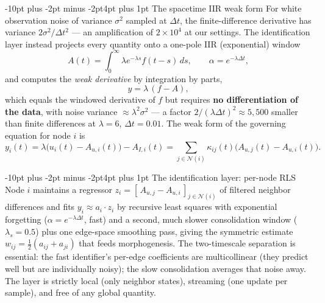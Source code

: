 \documentclass[10pt]{article}
\makeatletter
\renewcommand\subsection{\@startsection{subsection}{2}{\z@}%
  {-10pt plus -2pt minus -2pt}{4pt plus 1pt}%
  {\normalfont\bfseries\normalsize}}
\makeatother
\begin{document}
\subsection{The spacetime IIR weak form}
For white observation noise of variance $\sigma^2$ sampled at $\Delta t$, the
finite-difference derivative has variance $2\sigma^2/\Delta t^2$ --- an amplification of
$2 \times 10^4$ at our settings. The identification layer instead projects every
quantity onto a one-pole IIR (exponential) window
\begin{equation}
A(t) = \int_0^\infty \lambda e^{-\lambda s} f(t-s)\,ds, \qquad
\alpha = e^{-\lambda \Delta t},
\end{equation}
and computes the \emph{weak derivative} by integration by parts,
\begin{equation}
y = \lambda\,(f - A),
\end{equation}
which equals the windowed derivative of $f$ but requires \textbf{no differentiation of
the data}, with noise variance $\approx \lambda^2 \sigma^2$ --- a factor
$2/(\lambda \Delta t)^2 \approx 5{,}500$ smaller than finite differences at
$\lambda = 6$, $\Delta t = 0.01$. The weak form of the governing equation for node $i$
is
\begin{equation}
y_i(t) = \lambda\bigl(u_i(t) - A_{u,i}(t)\bigr) - A_{I,i}(t)
= \sum_{j \in \mathcal{N}(i)} \kappa_{ij}(t)\bigl(A_{u,j}(t) - A_{u,i}(t)\bigr).
\end{equation}

\subsection{The identification layer: per-node RLS}
Node $i$ maintains a regressor $z_i = [\,A_{u,j} - A_{u,i}\,]_{j \in \mathcal{N}(i)}$
of filtered neighbor differences and fits $y_i \approx a_i \cdot z_i$ by recursive
least squares with exponential forgetting ($\alpha = e^{-\lambda \Delta t}$, fast) and
a second, much slower consolidation window ($\lambda_s = 0.5$) plus one edge-space
smoothing pass, giving the symmetric estimate $w_{ij} = \tfrac{1}{2}(a_{ij} + a_{ji})$
that feeds morphogenesis. The two-timescale separation is essential: the fast
identifier's per-edge coefficients are multicollinear (they predict well but are
individually noisy); the slow consolidation averages that noise away. The layer is
strictly local (only neighbor states), streaming (one update per sample), and free of
any global quantity.
\end{document}
